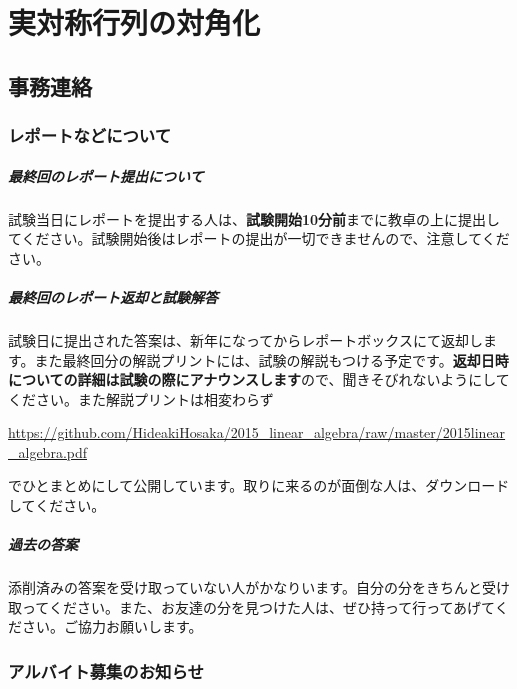 \chapter{実対称行列の対角化}

\section{事務連絡}

\subsection{レポートなどについて}

\paragraph{最終回のレポート提出について}

試験当日にレポートを提出する人は、\textbf{試験開始10分前}までに教卓の上に提出してください。試験開始後はレポートの提出が一切できませんので、注意してください。

\paragraph{最終回のレポート返却と試験解答}

試験日に提出された答案は、新年になってからレポートボックスにて返却します。また最終回分の解説プリントには、試験の解説もつける予定です。\textbf{返却日時についての詳細は試験の際にアナウンスします}ので、聞きそびれないようにしてください。また解説プリントは相変わらず
\begin{center}
\url{https://github.com/HideakiHosaka/2015_linear_algebra/raw/master/2015linear_algebra.pdf}
\end{center}
でひとまとめにして公開しています。取りに来るのが面倒な人は、ダウンロードしてください。

\paragraph{過去の答案}

添削済みの答案を受け取っていない人がかなりいます。自分の分をきちんと受け取ってください。また、お友達の分を見つけた人は、ぜひ持って行ってあげてください。ご協力お願いします。

\subsection{アルバイト募集のお知らせ}

